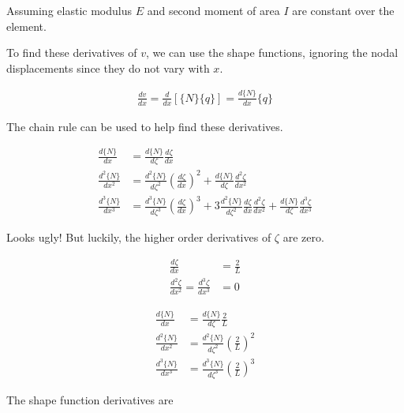 \documentclass[10pt,letterpaper]{article}
\begin{document}
	Assuming elastic modulus $E$ and second moment of area $I$ are constant over the element.

	To find these derivatives of $v$, we can use the shape functions, ignoring the nodal displacements since they do not vary with $x$.

	\begin{align}
		\frac{dv}{dx} = \frac{d}{dx} [\{N\} \{q\}] = \frac{d \{N\}}{dx} \{q\}
	\end{align}

	The chain rule can be used to help find these derivatives.

	\begin{align}
		\frac{d \{N\}}{d x} &= \frac{d \{N\}}{d \zeta} \frac{d \zeta}{d x} \\
		\frac{d^2 \{N\}}{d x^2} &= \frac{d^2 \{N\}}{d \zeta^2} (\frac{d \zeta}{d x})^2 + \frac{d \{N\}}{d \zeta} \frac{d^2 \zeta}{d x^2} \\
		\frac{d^3 \{N\}}{d x^3} &= \frac{d^3 \{N\}}{d \zeta^3} (\frac{d \zeta}{d x})^3 + 3 \frac{d^2 \{N\}}{d \zeta^2} \frac{d \zeta}{d x}\frac{d^2 \zeta}{d x^2} + \frac{d \{N\}}{d \zeta}\frac{d^3 \zeta}{d x^3}
	\end{align}

	Looks ugly! But luckily, the higher order derivatives of $\zeta$ are zero.

	\begin{align}
		\frac{d \zeta}{d x} &= \frac{2}{L} \\
		\frac{d^2 \zeta}{d x^2} = \frac{d^3 \zeta}{d x^3} &= 0
	\end{align}

	\begin{align}
		\frac{d \{N\}}{d x} &= \frac{d \{N\}}{d \zeta} \frac{2}{L} \\
		\frac{d^2 \{N\}}{d x^2} &= \frac{d^2 \{N\}}{d \zeta^2} (\frac{2}{L})^2 \\
		\frac{d^3 \{N\}}{d x^3} &= \frac{d^3 \{N\}}{d \zeta^3} (\frac{2}{L})^3
	\end{align}

	The shape function derivatives are
\end{document}
